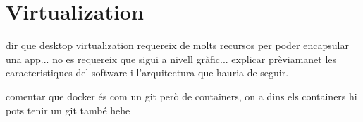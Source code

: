 \chapter{Virtualization}\label{D:virtualization}


dir que desktop virtualization requereix de molts recursos per poder encapsular una app... no es requereix que sigui a nivell gràfic... explicar prèviamanet les caracteristiques del software i l'arquitectura que hauria de seguir.

comentar que docker és com un git però de containers, on a dins els containers hi pots tenir un git també hehe